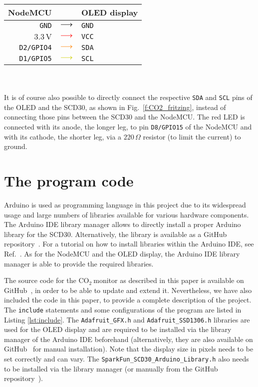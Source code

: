 \documentclass[12pt,a4paper]{article}
\newcommand*{\mathcolor}{}
\def\mathcolor#1#{\mathcoloraux{#1}}
\newcommand*{\mathcoloraux}[3]{%
  \protect\leavevmode
  \begingroup
    \color#1{#2}#3%
  \endgroup
}
\newcommand{\coo}{\ensuremath{\mathrm{CO_2}~}}
\begin{document}
\begin{tabular}{rcl}\toprule
	NodeMCU		& & OLED display\\\hline
	\texttt{GND}		& $\mathcolor{black}{\boldsymbol{\longrightarrow}}$	& \texttt{GND}\\
	$3.3\,\mathrm{V}$	& $\mathcolor{red}{\boldsymbol{\longrightarrow}}$		& \texttt{VCC}\\
	\texttt{D2/GPIO4}	& $\mathcolor{orange}{\boldsymbol{\longrightarrow}}$ 	& \texttt{SDA}\\
	\texttt{D1/GPIO5}	& $\mathcolor{Yellow3}{\boldsymbol{\longrightarrow}}$	& \texttt{SCL}\\
	\bottomrule
\end{tabular}\\
\quad\\

It is of course also possible to directly connect the respective \texttt{SDA} and \texttt{SCL} pins of the OLED and the SCD30, as shown in Fig.~\ref{f:CO2_fritzing}, instead of connecting those pins between the SCD30 and the NodeMCU. The red LED is connected with its anode, the longer leg, to pin \texttt{D8/GPIO15} of the NodeMCU and with its cathode, the shorter leg, via a $220\,\Omega$ resistor (to limit the current) to ground.  


\section{The program code}\label{s:code}
Arduino is used as programming language in this project due to its widespread usage and large numbers of libraries available for various hardware components. The Arduino IDE library manager allows to directly install a proper Arduino library for the SCD30. Alternatively, the library is available as a GitHub repository~\cite{SPARKFUN2020}. For a tutorial on how to install libraries within the Arduino IDE, see Ref.~\cite{SPARKFUN2020A}.
As for the NodeMCU and the OLED display, the Arduino IDE library manager is able to provide the required libraries.

The source code for the \coo monitor as described in this paper is available on GitHub~\cite{KOEHN2020}, in order to be able to update and extend it. Nevertheless, we have also included the code in this paper, to provide a complete description of the project. The \texttt{include} statements and some configurations of the program are listed in Listing \ref{lst:include}. The \texttt{Adafruit\_GFX.h} and \texttt{Adafruit\_SSD1306.h} libraries are used for the OLED display and are required to be installed via the library manager of the Arduino IDE beforehand (alternatively, they are also available on GitHub~\cite{ADAFRUIT2020A} for manual installation). Note that the display size in pixels needs to be set correctly and can vary. The \texttt{SparkFun\_SCD30\_Arduino\_Library.h} also needs to be installed via the library manager (or manually from the GitHub repository~\cite{SPARKFUN2020}).
\end{document}
